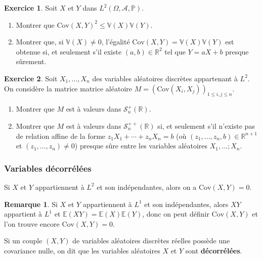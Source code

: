 \documentclass[french]{article}
\renewcommand{\P}{\mathbb{P}}
\newcommand{\R}{\mathbb{R}}
\newcommand{\E}{\mathbb{E}}
\newcommand{\V}{\mathbb{V}}
\theoremstyle{plain}
\theoremstyle{definition}
\newtheorem{exo}{Exercice}
\newtheorem*{rmq}{Remarque}
\theoremstyle{remark}
\begin{document}
\begin{exo}
	Soit $X$ et $Y$ dans $L^2(\Omega,\mathcal{A},\P)$.
	\begin{enumerate}
		\item Montrer que $\text{Cov}(X,Y)^2\leqslant\V(X)\V(Y)$.
		\item Montrer que, si $\V(X)\ne0$, l'égalité $\text{Cov}(X,Y)=\V(X)\V(Y)$ est obtenue si, et seulement s'il existe $(a,b)\in\R^2$ tel que $Y=aX+b$ presque sûrement.
	\end{enumerate}
\end{exo}

\begin{exo}
	Soit $X_1,\ldots,X_n$ des variables aléatoires discrètes appartenant à $L^2$. On considère la matrice matrice aléatoire $M=(\text{Cov}(X_i,X_j))_{1\leqslant i,j\leqslant n}$.
	\begin{enumerate}
		\item Montrer que $M$ est à valeurs dans $\mathcal{S}_n^+(\R)$.
		\item Montrer que $M$ est à valeurs dans $\mathcal{S}_n^{++}(\R)$ si, et seulement s'il n'existe pas de relation affine de la forme $z_1X_1+\cdots+z_nX_n=b$ (où $(z_1,\ldots,z_n,b)\in\R^{n+1}$ et $(z_1,\ldots,z_n)\ne0$) presque sûre entre les variables aléatoires $X_1,\ldots;X_n$.
	\end{enumerate}
\end{exo}

\subsubsection*{Variables décorrélées}

\begin{thm}{}%
	Si $X$ et $Y$ appartiennent à $L^2$ et son indépendantes, alors on a $\text{Cov}(X,Y)=0$.
\end{thm}

\begin{rmq}
	Si $X$ et $Y$ appartiennent à $L^1$ et son indépendantes, alors $XY$ appartient à $L^1$ et $\E(XY)=\E(X)\E(Y)$, donc on peut définir $\text{Cov}(X,Y)$ et l'on trouve encore $\text{Cov}(X,Y)=0$.
\end{rmq}

\begin{dfn}
	Si un couple $(X,Y)$ de variables aléatoires discrètes réelles possède une covariance nulle, on dit que les variables aléatoires $X$ et $Y$ sont \textbf{décorrélées}.
\end{dfn}
\end{document}
